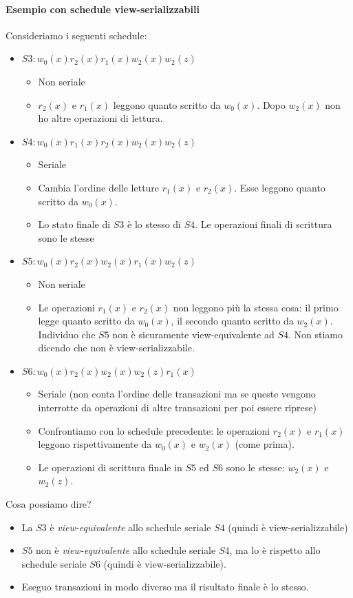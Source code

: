 \paragraph{Esempio con schedule view-serializzabili}
Consideriamo i seguenti schedule:
\begin{itemize}
	\item $S3:w_0(x)r_2(x)r_1(x)w_2(x)w_2(z)$
	\begin{itemize}
		\item Non seriale
		\item $r_2(x)$ e $r_1(x)$ leggono quanto scritto da $w_0(x)$. Dopo $w_2(x)$ non ho altre operazioni di lettura.
	\end{itemize}
	\item $S4:w_0(x)r_1(x)r_2(x)w_2(x)w_2(z)$
	\begin{itemize}
		\item Seriale
		\item Cambia l'ordine delle letture $r_1(x)$ e $r_2(x)$. Esse leggono quanto scritto da $w_0(x)$.
		\item Lo stato finale di $S3$ è lo stesso di $S4$. Le operazioni finali di scrittura sono le stesse
	\end{itemize}
	\item $S5:w_0(x)r_2(x)w_2(x)r_1(x)w_2(z)$
	\begin{itemize}
		\item Non seriale
		\item Le operazioni $r_1(x)$ e $r_2(x)$ non leggono più la stessa cosa: il primo legge quanto scritto da $w_0(x)$, il secondo quanto scritto da $w_2(x)$. Individuo che $S5$ non è sicuramente view-equivalente ad $S4$. Non stiamo dicendo che non è view-serializzabile.
	\end{itemize}
	\item $S6:w_0(x)r_2(x)w_2(x)w_2(z)r_1(x)$
	\begin{itemize}
		\item Seriale (non conta l'ordine delle transazioni ma se queste vengono interrotte da operazioni di altre transazioni per poi essere riprese)
		\item Confrontiamo con lo schedule precedente: le operazioni $r_2(x)$ e $r_1(x)$ leggono rispettivamente da $w_0(x)$ e $w_2(x)$ (come prima).
		\item Le operazioni di scrittura finale in $S5$ ed $S6$ sono le stesse: $w_2(x)$ e $w_2(z)$.
	\end{itemize}
\end{itemize}
Cosa possiamo dire?
\begin{itemize}
	\item La $S3$ è \emph{view-equivalente} allo schedule seriale $S4$ (quindi è view-serializzabile)
	\item $S5$ non è \emph{view-equivalente} allo schedule seriale $S4$, ma lo è rispetto allo schedule seriale $S6$ (quindi è view-serializzabile).
	\item Eseguo transazioni in modo diverso ma il risultato finale è lo stesso.
\end{itemize}
